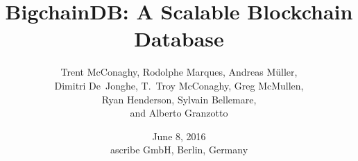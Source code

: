 \documentclass[a4paper]{scrartcl}
\title{\LARGE BigchainDB: A Scalable Blockchain Database}
\author{
  Trent McConaghy, 
  Rodolphe Marques,
  Andreas M\"{u}ller,\\
  Dimitri De~Jonghe,
  T.~Troy McConaghy,
  Greg McMullen,\\
  Ryan Henderson,
  Sylvain Bellemare,\\
  and
  Alberto Granzotto
}
\date{\normalsize June 8, 2016\\ascribe GmbH, Berlin, Germany}
\begin{document}
\maketitle















\begin{appendices}




\end{appendices}

{\footnotesize{}}

\end{document}
